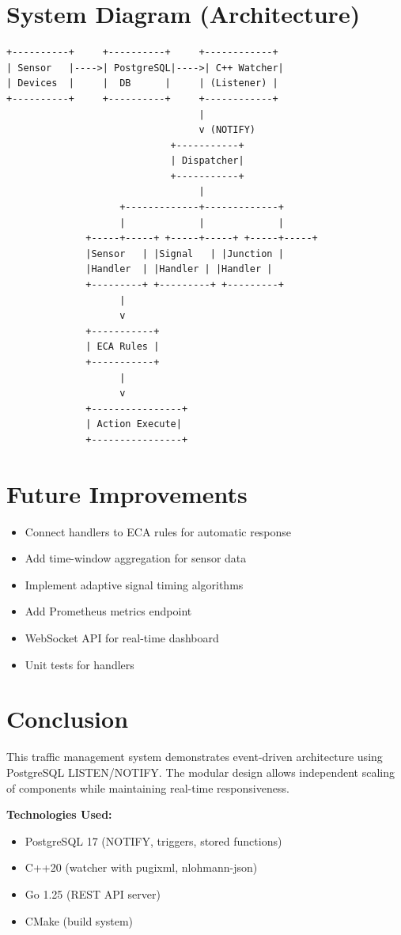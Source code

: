 \documentclass[12pt,a4paper]{article}
\begin{document}
\section{System Diagram (Architecture)}

\begin{verbatim}
+----------+     +----------+     +------------+
| Sensor   |---->| PostgreSQL|---->| C++ Watcher|
| Devices  |     |  DB      |     | (Listener) |
+----------+     +----------+     +------------+
                                  |
                                  v (NOTIFY)
                             +-----------+
                             | Dispatcher|
                             +-----------+
                                  |
                    +-------------+-------------+
                    |             |             |
              +-----+-----+ +-----+-----+ +-----+-----+
              |Sensor   | |Signal   | |Junction |
              |Handler  | |Handler | |Handler |
              +---------+ +---------+ +---------+
                    |
                    v
              +-----------+
              | ECA Rules |
              +-----------+
                    |
                    v
              +----------------+
              | Action Execute|
              +----------------+
\end{verbatim}

\section{Future Improvements}

\begin{itemize}
    \item Connect handlers to ECA rules for automatic response
    \item Add time-window aggregation for sensor data
    \item Implement adaptive signal timing algorithms
    \item Add Prometheus metrics endpoint
    \item WebSocket API for real-time dashboard
    \item Unit tests for handlers
\end{itemize}

\section{Conclusion}

This traffic management system demonstrates event-driven architecture using PostgreSQL LISTEN/NOTIFY. The modular design allows independent scaling of components while maintaining real-time responsiveness.

\bigskip
\textbf{Technologies Used:}
\begin{itemize}
    \item PostgreSQL 17 (NOTIFY, triggers, stored functions)
    \item C++20 (watcher with pugixml, nlohmann-json)
    \item Go 1.25 (REST API server)
    \item CMake (build system)
\end{itemize}
\end{document}
